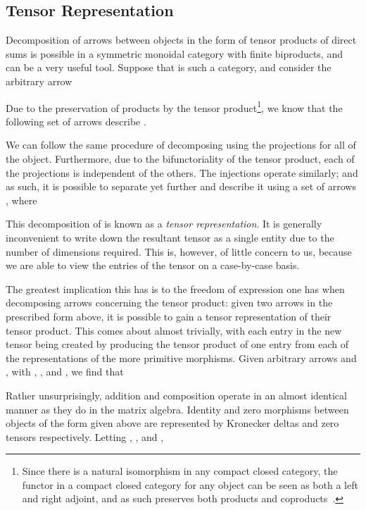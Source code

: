 \documentclass{LMCS}
\theoremstyle{plain}\newtheorem*{cLm}{Claim}
\newcommand{\p}{} \newcommand{\N}{\mathbb{N}}
\newcommand{\hughd}[1]{#1}
\begin{document}
\subsection{Tensor Representation} \label{SectionTensorRep}

Decomposition of arrows between objects in the form of tensor products of direct sums is possible in a symmetric monoidal category with finite biproducts, and can be a very useful tool. Suppose that  is such a category, and consider the arbitrary arrow

Due to the preservation of products by the tensor product\footnote{\hughd{Since there is a natural isomorphism  in any compact closed category, the functor  in a compact closed category for any object  can be seen as both a left and right adjoint, and as such preserves both products and coproducts~\cite{Mac97}.}}, we know that the following set of  arrows describe .

We can follow the same procedure of decomposing  using the projections \linebreak  for all  of the object. Furthermore, due to the bifunctoriality of the tensor product, each of the projections is independent of the others. The injections operate similarly; and as such, it is possible to separate  yet further and describe it using a set of  arrows , where


This decomposition of  is known as a \emph{tensor representation}. It is generally inconvenient to write down the resultant tensor as a single entity due to the number of dimensions required. This is, however, of little concern to us, because we are able to view the entries of the tensor on a case-by-case basis.

\p The greatest implication this has is to the freedom of expression one has when decomposing arrows concerning the tensor product: given two arrows in the prescribed form above, it is possible to gain a tensor representation of their tensor product. This comes about almost trivially, with each entry in the new tensor being created by producing the tensor product of one entry from each of the representations of the more primitive morphisms. Given arbitrary arrows  and , with , ,  and , we find that


\noindent Rather unsurprisingly, addition and composition operate in an almost identical manner as they do in the matrix algebra. Identity and zero morphisms between objects of the form given above are represented by Kronecker deltas and zero tensors respectively. Letting , , and ,
\end{document}
